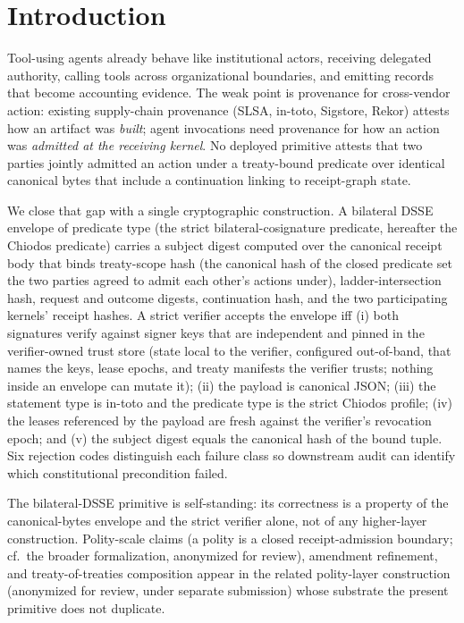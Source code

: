 \section{Introduction}

Tool-using agents already behave like institutional actors, receiving delegated authority, calling tools across organizational boundaries, and emitting records that become accounting evidence. The weak point is provenance for cross-vendor action: existing supply-chain provenance (SLSA, in-toto, Sigstore, Rekor) attests how an artifact was \emph{built}; agent invocations need provenance for how an action was \emph{admitted at the receiving kernel}. No deployed primitive attests that two parties jointly admitted an action under a treaty-bound predicate over identical canonical bytes that include a continuation linking to receipt-graph state.

We close that gap with a single cryptographic construction. A bilateral DSSE envelope of predicate type  (the strict bilateral-cosignature predicate, hereafter the Chiodos predicate) carries a subject digest computed over the canonical receipt body that binds treaty-scope hash (the canonical hash of the closed predicate set the two parties agreed to admit each other's actions under), ladder-intersection hash, request and outcome digests, continuation hash, and the two participating kernels' receipt hashes. A strict verifier accepts the envelope iff (i) both signatures verify against signer keys that are independent and pinned in the verifier-owned trust store (state local to the verifier, configured out-of-band, that names the keys, lease epochs, and treaty manifests the verifier trusts; nothing inside an envelope can mutate it); (ii) the payload is canonical JSON; (iii) the statement type is in-toto and the predicate type is the strict Chiodos profile; (iv) the leases referenced by the payload are fresh against the verifier's revocation epoch; and (v) the subject digest equals the canonical hash of the bound tuple. Six rejection codes distinguish each failure class so downstream audit can identify which constitutional precondition failed.

The bilateral-DSSE primitive is self-standing: its correctness is a property of the canonical-bytes envelope and the strict verifier alone, not of any higher-layer construction. Polity-scale claims (a polity is a closed receipt-admission boundary; cf.\ the broader formalization, anonymized for review), amendment refinement, and treaty-of-treaties composition appear in the related polity-layer construction (anonymized for review, under separate submission) whose substrate the present primitive does not duplicate.

